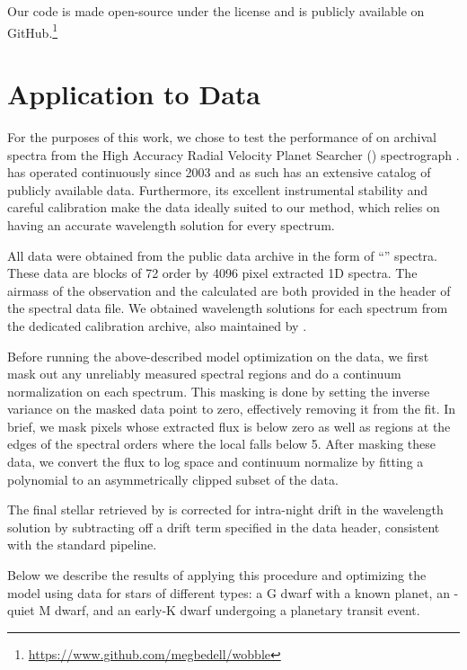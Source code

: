 \documentclass[modern]{aastex62}
\begin{document}
Our code is made open-source under the  license and is publicly available on GitHub.\footnote{\url{https://www.github.com/megbedell/wobble}}



\section{Application to \HARPS Data}
\label{s:results}

For the purposes of this work, we chose to test the performance of \wobble on archival spectra from the High Accuracy Radial Velocity Planet Searcher (\HARPS) spectrograph \citep{Mayor2003}.
\HARPS has operated continuously since 2003 and as such has an extensive catalog of publicly available data.
Furthermore, its excellent instrumental stability and careful calibration make the data ideally suited to our method, which relies on having an accurate wavelength solution for every spectrum.

All data were obtained from the  public data archive in the form of ``'' spectra.
These data are blocks of 72 order by 4096 pixel extracted 1D spectra.
The airmass of the observation and the calculated \BERV are both provided in the  header of the spectral data file.
We obtained wavelength solutions for each spectrum from the dedicated \HARPS calibration archive, also maintained by .

Before running the above-described model optimization on the data, we first mask out any unreliably measured spectral regions and do a continuum normalization on each spectrum.
This masking is done by setting the inverse variance on the masked data point to zero, effectively removing it from the fit.
In brief, we mask pixels whose extracted flux is below zero as well as regions at the edges of the spectral orders where the local \SNR falls below 5.
After masking these data, we convert the flux to log space and continuum normalize by fitting a polynomial to an asymmetrically clipped subset of the data.

The final stellar \RV retrieved by \wobble is corrected for intra-night drift in the wavelength solution by subtracting off a drift term specified in the data header, consistent with the standard \HARPS pipeline. 

Below we describe the results of applying this procedure and optimizing the \wobble model using \HARPS data for stars of different types: a G dwarf with a known planet, an \RV-quiet M dwarf, and an early-K dwarf undergoing a planetary transit event.
\end{document}
